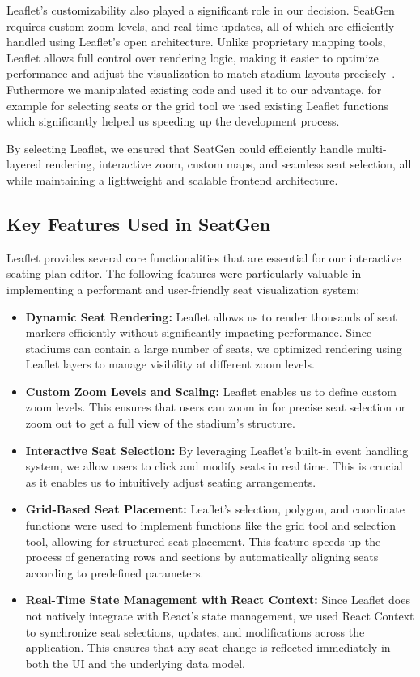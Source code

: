 Leaflet’s customizability also played a significant role in our decision. SeatGen requires custom zoom levels, and real-time updates, all of which are efficiently handled using Leaflet’s open architecture. Unlike proprietary mapping tools, Leaflet allows full control over rendering logic, making it easier to optimize performance and adjust the visualization to match stadium layouts precisely~\cite{Leaflet}. Futhermore we manipulated existing code and used it to our advantage, for example for selecting seats or the grid tool we used existing Leaflet functions which significantly helped us speeding up the development process.

By selecting Leaflet, we ensured that SeatGen could efficiently handle multi-layered rendering, interactive zoom, custom maps, and seamless seat selection, all while maintaining a lightweight and scalable frontend architecture.

\subsection{Key Features Used in SeatGen}

Leaflet provides several core functionalities that are essential for our interactive seating plan editor. The following features were particularly valuable in implementing a performant and user-friendly seat visualization system:

\begin{itemize}
    \item \textbf{Dynamic Seat Rendering:} Leaflet allows us to render thousands of seat markers efficiently without significantly impacting performance. Since stadiums can contain a large number of seats, we optimized rendering using Leaflet layers to manage visibility at different zoom levels.
    \item \textbf{Custom Zoom Levels and Scaling:} Leaflet enables us to define custom zoom levels. This ensures that users can zoom in for precise seat selection or zoom out to get a full view of the stadium’s structure.
    \item \textbf{Interactive Seat Selection:} By leveraging Leaflet’s built-in event handling system, we allow users to click and modify seats in real time. This is crucial as it enables us to intuitively adjust seating arrangements.
    \item \textbf{Grid-Based Seat Placement:} Leaflet’s selection, polygon, and coordinate functions were used to implement functions like the grid tool and selection tool, allowing for structured seat placement. This feature speeds up the process of generating rows and sections by automatically aligning seats according to predefined parameters.
    \item \textbf{Real-Time State Management with React Context:} Since Leaflet does not natively integrate with React’s state management, we used React Context to synchronize seat selections, updates, and modifications across the application. This ensures that any seat change is reflected immediately in both the UI and the underlying data model.
\end{itemize}

